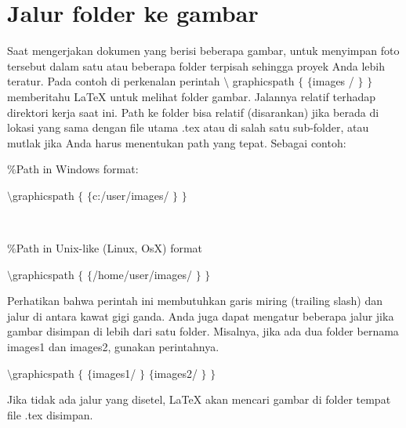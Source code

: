 \section {Jalur folder ke gambar }
\vspace{12pt}
\noindent
Saat mengerjakan dokumen yang berisi beberapa gambar, untuk menyimpan foto tersebut dalam satu atau beberapa folder terpisah sehingga proyek Anda lebih teratur. Pada contoh di perkenalan perintah  $  \setminus  $ graphicspath  $  \{  $ $  \{  $images / $  \}  $ $  \}  $ memberitahu LaTeX untuk melihat folder gambar. Jalannya relatif terhadap direktori kerja saat ini. Path ke folder bisa relatif (disarankan) jika berada di lokasi yang sama dengan file utama .tex atau di salah satu sub-folder, atau mutlak jika Anda harus menentukan path yang tepat. Sebagai contoh: \par
\vspace{12pt}
\vspace{12pt}
\vspace{12pt}
\vspace{12pt}
\noindent
 $  \%  $Path in Windows format: \par
\vspace{12pt}
\noindent
 $  \setminus  $graphicspath $  \{  $  $  \{  $c:/user/images/ $  \}  $  $  \}  $ \par
\noindent
 $  $ \par
\noindent
 $  \%  $Path in Unix-like (Linux, OsX) format \par
\vspace{12pt}
\noindent
 $  \setminus  $graphicspath $  \{  $  $  \{  $/home/user/images/ $  \}  $  $  \}  $ \par
\vspace{12pt}
\vspace{12pt}
\vspace{12pt}
\noindent
Perhatikan bahwa perintah ini membutuhkan garis miring (trailing slash) dan jalur di antara kawat gigi ganda. Anda juga dapat mengatur beberapa jalur jika gambar disimpan di lebih dari satu folder. Misalnya, jika ada dua folder bernama images1 dan images2, gunakan perintahnya. \par
\vspace{12pt}
\noindent
 $  \setminus  $graphicspath $  \{  $  $  \{  $images1/ $  \}  $ $  \{  $images2/ $  \}  $  $  \}  $ \par
\noindent
\vspace{\baselineskip}
\vspace{12pt}
\noindent
Jika tidak ada jalur yang disetel, LaTeX akan mencari gambar di folder tempat file .tex disimpan. \par
\vspace{18pt}
\noindent
